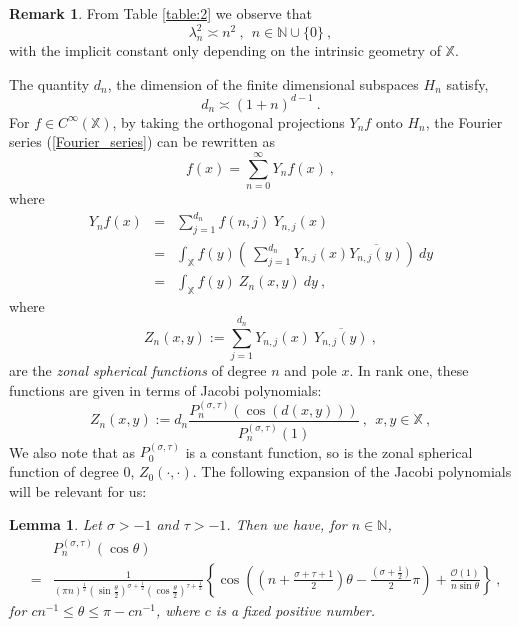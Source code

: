 \documentclass[12pt]{amsart}
\newtheorem{lemma}[theorem]{Lemma}
\theoremstyle{definition}
\newtheorem{remark}[theorem]{Remark}
\newcommand{\what}{\widehat}
\newcommand{\N}{\mathbb N}%
\newcommand{\X}{\mathbb X}%
\numberwithin{equation}{section}
\begin{document}
\begin{remark} \label{rank1_eigenvalue_remark}
From Table \ref{table:2} we observe that 
\begin{equation*}
\lambda^2_n \asymp n^2\:,\:\: n \in \N \cup \{0\}\:,
\end{equation*}
with the implicit constant only depending on the intrinsic geometry of $\X$.
\end{remark}

The quantity $d_n$, the dimension of the finite dimensional subspaces $H_n$ satisfy,
\begin{equation} \label{dimension_growth}
d_n \asymp \left(1+n\right)^{d-1}\:.
\end{equation}
For $f \in C^\infty(\X)$, by taking the orthogonal projections $Y_nf$ onto $H_n$, the Fourier series (\ref{Fourier_series}) can be rewritten as
\begin{equation} \label{dummy_series}
f(x)=\sum_{n=0}^\infty Y_nf(x)\:,
\end{equation}
where 
\begin{eqnarray*}
 Y_nf(x) &=& \sum_{j=1}^{d_n} \what{f}(n,j)\:Y_{n,j}(x) \\
 &=& \int_{\X} f(y)\left(\:\sum_{j=1}^{d_n} Y_{n,j}(x)\overline{Y_{n,j}(y)}\right)\:dy \\
 &=& \int_{\X} f(y)\:Z_n(x,y)\:dy\:,
\end{eqnarray*}
where 
\begin{equation*}
Z_n(x,y):=\sum_{j=1}^{d_n} Y_{n,j}(x)\:\overline{Y_{n,j}(y)}\:,
\end{equation*}
are the {\em zonal spherical functions} of degree $n$ and pole $x$. In rank one, these functions are given in terms of Jacobi polynomials:
\begin{equation} \label{in_terms_jacobi}
Z_n(x,y):= d_n \frac{P^{(\sigma,\tau)}_n{\left(\cos(d(x,y))\right)}}{P^{(\sigma,\tau)}_n(1)}\:,\:\:x,y \in \X\:,
\end{equation}
We also note that as $P^{(\sigma,\tau)}_0$ is a constant function, so is the zonal spherical function of degree $0$, $Z_0(\cdot,\cdot)$. The following expansion of the Jacobi polynomials will be relevant for us:
\begin{lemma} \cite[Theorem 8.21.13]{Szego}\label{jacobi_polynomial}
Let $\sigma >-1$ and $\tau>-1$. Then we have, for $n \in \N$,
\begin{eqnarray*}
&&P^{(\sigma,\tau)}_n (\cos \theta)\\
&=& \frac{1}{(\pi n)^{\frac{1}{2}} \left(\sin \frac{\theta}{2}\right)^{\sigma +\frac{1}{2}}\left(\cos \frac{\theta}{2}\right)^{\tau +\frac{1}{2}}}\left\{\cos\left(\left(n+\frac{\sigma+\tau+1}{2}\right)\theta -\frac{\left(\sigma +\frac{1}{2}\right)}{2}\pi\right)+\frac{\mathcal{O}(1)}{n\sin\theta}\right\}\:,
\end{eqnarray*}
for $cn^{-1} \le \theta \le \pi -cn^{-1}$, where $c$ is a fixed positive number.
\end{lemma}
 
\end{document}
